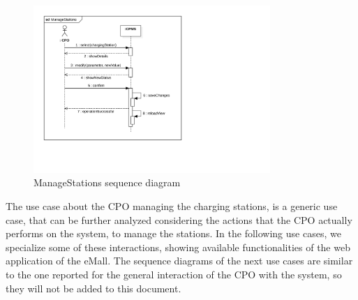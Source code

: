 \begin{figure}[H]
    \centering
    \includegraphics[width=0.8\textwidth, trim={0 4cm 11cm 0}, clip]{Images/cp3/seqDiagrams/ManageStations.pdf}
    \caption{ManageStations sequence diagram}
\end{figure}

The use case about the CPO managing the charging stations, is a generic use case, that can be further analyzed considering the actions that the CPO actually performs on the system, to manage the stations. In the following use cases, we specialize some of these interactions, showing available functionalities of the web application of the eMall. The sequence diagrams of the next use cases are similar to the one reported for the general interaction of the CPO with the system, so they will not be added to this document.

